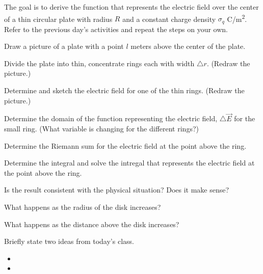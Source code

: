 \begin{problem}
  \item The goal is to derive the function that represents the electric field over the center of
    a thin circular plate with radius $R$ and a constant charge density $\sigma_q$ C/m\textsuperscript{2}.
    Refer to the previous day's activities and repeat the steps on your own.
  \begin{subproblem}
    \item Draw a picture of a plate with a point $l$ meters above the center of the plate.
      \vfill
   \item Divide the plate into thin, concentrate rings each with width $\triangle r$.  (Redraw the picture.)
      \vfill
   \item Determine and sketch the electric field for one of the thin rings.  (Redraw the picture.)
       \vfill

    \clearpage

   \item Determine the domain of the function representing the electric field, $\triangle \vec{E}$
      for the small ring. (What variable is changing for the different rings?)
      \vspace{2em}

    \item Determine the Riemann sum for the electric field at the point above the ring.
      \vfill

    \item Determine the integral and solve the intregal that represents the electric field at the point above the ring.
      \vfill
      \vfill
      \vfill

    \clearpage

    \item Is the result consistent with the physical situation? Does it make sense?
       \vfill

     \item What happens as the radius of the disk increases?
        \vfill

      \item What happens as the distance above the disk increases?
       \vfill

  \end{subproblem}
\end{problem}

\postClass

\begin{problem}
\item Briefly state two ideas from today's class.
  \begin{itemize}
  \item
  \item
  \end{itemize}
\end{problem}

